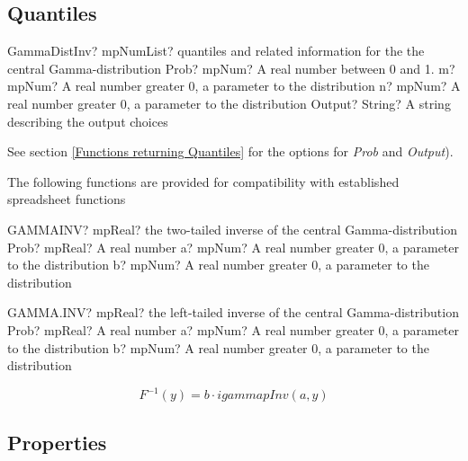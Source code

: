 \subsection{Quantiles}

\begin{mpFunctionsExtract}
	\mpFunctionThreeNotImplemented
	{GammaDistInv? mpNumList? quantiles and related information for the the central Gamma-distribution}
	{Prob? mpNum? A real number between 0 and 1.}
	{m? mpNum? A real number greater 0, a parameter to the distribution}
	{n? mpNum? A real number greater 0, a parameter to the distribution}
	{Output? String? A string describing the output choices}
\end{mpFunctionsExtract}

See section \ref{Functions returning Quantiles} for the options for  {\itshape\sffamily Prob} and {\itshape\sffamily Output}). 

\vspace{0.3cm}

The following functions are provided for compatibility with established spreadsheet functions

\vspace{0.3cm}
\begin{mpFunctionsExtract}
	\mpWorksheetFunctionThreeNotImplemented
	{GAMMAINV? mpReal? the two-tailed inverse of the central Gamma-distribution}
	{Prob? mpReal? A real number}
	{a? mpNum? A real number greater 0, a parameter to the distribution}
	{b? mpNum? A real number greater 0, a parameter to the distribution}
\end{mpFunctionsExtract}

\vspace{0.6cm}
\begin{mpFunctionsExtract}
	\mpWorksheetFunctionThreeNotImplemented
	{GAMMA.INV? mpReal? the left-tailed inverse of the central Gamma-distribution}
	{Prob? mpReal? A real number}
	{a? mpNum? A real number greater 0, a parameter to the distribution}
	{b? mpNum? A real number greater 0, a parameter to the distribution}
\end{mpFunctionsExtract}



\vspace{0.3cm}
\begin{equation} 
	F^{-1}(y)= b \cdot igammapInv(a,y)
\end{equation}



\subsection{Properties}
\label{GammaDistributionProperties}


